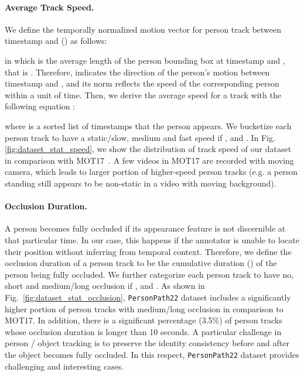 \documentclass[runningheads]{llncs}
\begin{document}
\paragraph{\textbf{Average Track Speed.}}
We define the temporally normalized motion vector  for person track  between timestamp  and  () as follows:

in which  is the average length 
of the person bounding box at timestamp  and , that is . Therefore,  indicates the direction of the person's motion between timestamp  and , and its  norm  reflects the speed of the corresponding person within a unit of time. Then, we derive the average speed  for a track with the following equation
:

where  is a sorted list of timestamps that the person appears. We bucketize each person track to have a static/slow, medium and fast speed if ,  and . In Fig. \ref{fig:dataset_stat_speed}, we show the distribution of track speed of our dataset in comparison with MOT17~\cite{mot}. A few videos in MOT17 are recorded with moving camera, which leads to larger portion of higher-speed person tracks (e.g. a person standing still appears to be non-static in a video with moving background). 





\paragraph{\textbf{Occlusion Duration.}}
A person becomes fully occluded if its appearance feature is not discernible at that particular time. In our case,  this happens if the annotator is unable to locate their position without inferring from temporal context. Therefore, we define the occlusion duration of a person track to be the cumulative duration () of the person being fully occluded. We further categorize each person track to have no, short and medium/long occlusion if ,  and . As shown in Fig.~\ref{fig:dataset_stat_occlusion}, \texttt{PersonPath22} dataset includes a significantly higher portion of person tracks with medium/long occlusion in comparison to MOT17. In addition, there is a significant percentage (3.5\%) of person tracks whose occlusion duration is longer than 10 seconds. A particular challenge in person / object tracking is to preserve the identity consistency before and after the object becomes fully occluded. In this respect, \texttt{PersonPath22} dataset provides challenging and interesting cases. 
\end{document}
